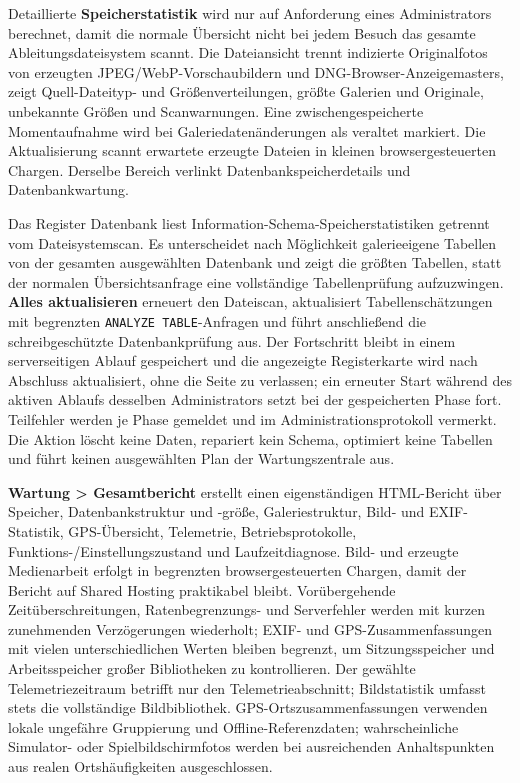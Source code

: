\documentclass[11pt,a4paper]{article}
\newcommand{\ui}[1]{\textbf{#1}}
\newcommand{\codeword}[1]{\nolinkurl{#1}}
\begin{document}

Detaillierte \ui{Speicherstatistik} wird nur auf Anforderung eines
Administrators berechnet, damit die normale Übersicht nicht bei jedem Besuch das
gesamte Ableitungsdateisystem scannt. Die Dateiansicht trennt indizierte
Originalfotos von erzeugten JPEG/WebP-Vor\-schau\-bil\-dern und
DNG-Browser-Anzeigemasters, zeigt Quell-Dateityp- und Größenverteilungen, größte
Galerien und Originale, unbekannte Größen und Scanwarnungen. Eine
zwischengespeicherte Momentaufnahme wird bei Galeriedatenänderungen als veraltet
markiert. Die Aktualisierung scannt erwartete erzeugte Dateien in kleinen
browsergesteuerten Chargen. Derselbe Bereich verlinkt Datenbankspeicherdetails
und Datenbankwartung.

Das Register Datenbank liest Information-Schema-Speicherstatistiken getrennt vom
Dateisystemscan. Es unterscheidet nach Möglichkeit galerieeigene Tabellen von
der gesamten ausgewählten Datenbank und zeigt die größten Tabellen, statt der
normalen Übersichtsanfrage eine vollständige Tabellenprüfung aufzuzwingen.
\ui{Alles aktualisieren} erneuert den Dateiscan, aktualisiert
Tabellenschätzungen mit begrenzten \codeword{ANALYZE TABLE}-Anfragen und führt
anschließend die schreibgeschützte Datenbankprüfung aus. Der Fortschritt bleibt
in einem serverseitigen Ablauf gespeichert und die angezeigte Registerkarte wird
nach Abschluss aktualisiert, ohne die Seite zu verlassen; ein erneuter Start
während des aktiven Ablaufs desselben Administrators setzt bei der gespeicherten
Phase fort. Teilfehler werden je Phase gemeldet und im Administrationsprotokoll
vermerkt. Die Aktion löscht keine Daten, repariert kein Schema, optimiert keine
Tabellen und führt keinen ausgewählten Plan der Wartungszentrale aus.

\ui{Wartung > Gesamtbericht} erstellt einen eigenständigen HTML-Bericht über
Speicher, Datenbankstruktur und -größe, Galeriestruktur, Bild- und
EXIF-Statistik, GPS-Übersicht, Telemetrie, Betriebsprotokolle,
Funktions-/Einstellungszustand und Laufzeitdiagnose. Bild- und erzeugte
Medienarbeit erfolgt in begrenzten browsergesteuerten Chargen, damit der Bericht
auf Shared Hosting praktikabel bleibt. Vorübergehende Zeitüberschreitungen,
Ratenbegrenzungs- und Serverfehler werden mit kurzen zunehmenden Verzögerungen
wiederholt; EXIF- und GPS-Zusammenfassungen mit vielen unterschiedlichen Werten
bleiben begrenzt, um Sitzungsspeicher und Arbeitsspeicher großer Bibliotheken zu
kontrollieren. Der gewählte Telemetriezeitraum betrifft nur den
Telemetrieabschnitt; Bildstatistik umfasst stets die vollständige
Bildbibliothek. GPS-Ortszusammenfassungen verwenden lokale ungefähre Gruppierung
und Offline-Referenzdaten; wahrscheinliche Simulator- oder Spielbildschirmfotos
werden bei ausreichenden Anhaltspunkten aus realen Ortshäufigkeiten
ausgeschlossen.
\end{document}
